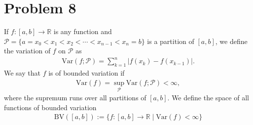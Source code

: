 \documentclass[10pt]{extarticle}
\newcommand{\R}{\mathbb{R}}
\begin{document}
  \section{Problem 8}%
  If $f: [a,b]\rightarrow\R$ is any function and $\mathcal{P} = \{a=x_0<x_1<x_2 < \cdots < x_{n-1} < x_n = b\}$ is a partition of $[a,b]$, we define the variation of $f$ on $\mathcal{P}$ as
  \begin{align*}
    \text{Var}(f;\mathcal{P}) = \sum_{k=1}^{n}|f(x_k)-f(x_{k-1})|.
  \end{align*}
  We say that $f$ is of bounded variation if
  \begin{align*}
    \text{Var}(f) = \sup_{\mathcal{P}}\text{Var}(f;\mathcal{P}) < \infty,
  \end{align*}
  where the supremum runs over all partitions of $[a,b]$. We define the space of all functions of bounded variation
  \begin{align*}
    \text{BV}([a,b]) := \{f:[a,b]\rightarrow\R\mid \text{Var}(f)<\infty\}
  \end{align*}
\end{document}
